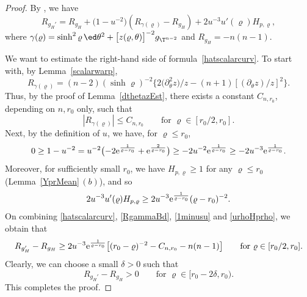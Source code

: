 \begin{proof}


By \cite[Claim 2.1]{SWW2022}, we have
\begin{equation}\label{hatscalarcurv}
R_{g_H'}=R_{g_H}+\bigl(1-u^{-2}\bigr)(R_{\gamma(\varrho)}-R_{g_H})+2u^{-3}u'(\varrho) H_{p,\varrho},
\end{equation}
where
${\gamma(\varrho)}= \sinh^2 \varrho \,\ed\theta^2 +\bigl[z(\varrho,\theta)\bigr]^{-2}g_{\T^{n-2}}$ and $R_{g_H} = -n(n-1)$.

We want to estimate the right-hand side of formula~\eqref{hatscalarcurv}. To start with, by Lemma~\ref{scalarwarp},
\begin{equation*}%
R_{\gamma(\varrho)}= (n-2) (\sinh \varrho )^{-2}
\big\{2\big(\partial_\theta^2 z\big)/z -(n+1)[(\partial_\theta z)/z]^2\big\}.
\end{equation*}
Thus, by the proof of Lemma~\ref{dthetazEst}, there exists a constant $C_{n,r_0}$,
depending on $n,r_0$ only, such that
\begin{equation}\label{RgammaBd}
|R_{\gamma(\varrho)}|\leq C_{n,r_0}\qquad\mbox{for } \varrho \in [r_0/2, r_0].
\end{equation}
Next, by the definition of $u$, we have, for $\varrho\le r_0$,
\begin{equation}\label{1minusu}
	0\ge 1 - u^{-2} = u^{-2}\bigl(-2 {\rm e}^{\frac{1}{\varrho - r_0}} + {\rm e}^{\frac{2}{\varrho - r_0}}\bigr) \ge - 2u^{-2} {\rm e}^{\frac{1}{\varrho - r_0}} \ge -2u^{-3} {\rm e}^{\frac{1}{\varrho - r_0}} .
\end{equation}
Moreover, for sufficiently small $r_0$, we have
$H_{p,\varrho} \geq 1$ for any $\varrho\le r_0$ (Lemma~\ref{YprMean}\,$(b)$), and so
\begin{equation}\label{urhoHprho}
	2u^{-3} u'(\varrho) H_{p,\varrho}  \ge 2u^{-3} {\rm e}^{\frac{1}{\varrho - r_0}}(\varrho - r_0)^{-2}.
\end{equation}
On combining \eqref{hatscalarcurv}, \eqref{RgammaBd}, \eqref{1minusu}
and \eqref{urhoHprho}, we obtain that
\begin{equation*}%
	R_{g_H'} - R_{g_H} \ge 2u^{-3} {\rm e}^{\frac{1}{\varrho - r_0}}
	\bigl[(r_0 - \varrho)^{-2} - C_{n,r_0} - n(n-1)\bigr]\qquad\mbox{for } \varrho\in [r_0/2, r_0].
\end{equation*}
Clearly, we can choose a small $\delta>0$ such that
\begin{equation*}%
 R_{g_H'} - R_{g_H} >0 \qquad \mbox{for }
 \varrho \in [r_0-2\delta, r_0).
\end{equation*}
This completes the proof.
\end{proof}


